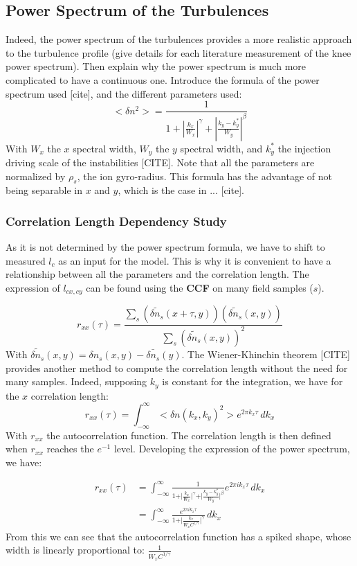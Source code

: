 \documentclass[11pt,a4paper,openany]{report}
\begin{document}
\begin{multicols}{2}
    \subsection{Power Spectrum of the Turbulences}

    Indeed, the power spectrum of the turbulences provides a more realistic approach to the turbulence profile (give details for each literature measurement of the knee power spectrum). Then explain why the power spectrum is much more complicated to have a continuous one. Introduce the formula of the power spectrum used [cite], and the different parameters used:
    $$
        <\delta n^2 > = \frac{1}{1 + \left| \frac{k_x}{W_x} \right|^\gamma + \left| \frac{k_y - k_y^*}{W_y} \right|^\beta}
    $$
    With $W_x$ the $x$ spectral width, $W_y$ the $y$ spectral width, and $k_y^*$ the injection driving scale of the instabilities [CITE]. Note that all the parameters are normalized by $\rho_s$, the ion gyro-radius. This formula has the advantage of not being separable in $x$ and $y$, which is the case in ... [cite].

    \subsubsection{Correlation Length Dependency Study}

    As it is not determined by the power spectrum formula, we have to shift to measured $l_c$ as an input for the model. This is why it is convenient to have a relationship between all the parameters and the correlation length. The expression of $l_{cx,cy}$ can be found using the \textbf{CCF} on many field samples ($s$).

    $$
        r_{xx}(\tau) = \frac{\sum_{s}\left(\tilde{\delta n_s}(x + \tau, y)\right)\left(\tilde{\delta n_s}(x, y)\right)}{\sum_{s}\left(\tilde{\delta n_s}(x, y)\right)^2}
    $$
    With $\tilde{\delta n_s}(x,y) = \delta n_s(x,y) - \bar{\delta n_s}(y)$. The Wiener-Khinchin theorem [CITE] provides another method to compute the correlation length without the need for many samples. Indeed, supposing $k_y$ is constant for the integration, we have for the $x$ correlation length:
    $$
        r_{xx}(\tau) = \int_{-\infty}^{\infty} <\delta n(k_x, k_y)^2> e^{2 \pi k_x \tau} \, dk_x
    $$
    With $r_{xx}$ the autocorrelation function. The correlation length is then defined when $r_{xx}$ reaches the $e^{-1}$ level. Developing the expression of the power spectrum, we have:

    \begin{align}
        r_{x x}(\tau) & = \int_{-\infty}^{\infty} \frac{1}{1 + \vert \frac{k_x}{W_x} \vert^\gamma + \vert \frac{k_y - k_y^*}{W_y}\vert^\beta} e^{2 \pi i k_x \tau} \, dk_x \\
                      & = \int_{-\infty}^{\infty} \frac{e^{2 \pi i k_x \tau}}{1 + \vert \frac{k_x}{W_x C^{1/ \gamma}} \vert^\gamma} \, dk_x
    \end{align}
    From this we can see that the autocorrelation function has a spiked shape, whose width is linearly proportional to:
    $\frac{1}{W_x C^{1/ \gamma}}$


\end{multicols}
\end{document}

